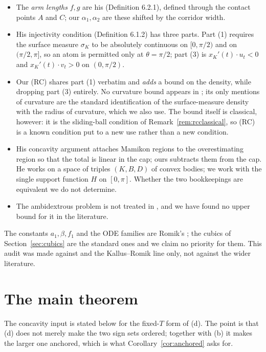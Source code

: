 \documentclass[11pt]{article}
\theoremstyle{definition}
\begin{document}
\begin{itemize}
\item The \emph{arm lengths} $f,g$ are his (Definition 6.2.1), defined through the contact
points $A$ and $C$; our $\alpha_1,\alpha_2$ are these shifted by the corridor width.
\item His injectivity condition (Definition 6.1.2) has three parts. Part (1) requires the
surface measure $\sigma_K$ to be absolutely continuous on $[0,\pi/2)$ and on $(\pi/2,\pi]$,
so an atom is permitted only at $\theta=\pi/2$; part (3) is
$x_K'(t)\cdot u_t<0$ and $x_K'(t)\cdot v_t>0$ on $(0,\pi/2)$.
\item Our (RC) shares part (1) verbatim and \emph{adds} a bound on the density, while
dropping part (3) entirely. No curvature bound appears in \cite{Bae24}; its only mentions
of curvature are the standard identification of the surface-measure density with the
radius of curvature, which we also use. The bound itself is classical, however: it is the
sliding-ball condition of Remark~\ref{rem:rcclassical}, so (RC) is a known condition put to
a new use rather than a new condition.
\item His concavity argument attaches Mamikon regions to the overestimating region so that
the total is linear in the cap; ours subtracts them from the cap. He works on a space of
triples $(K,B,D)$ of convex bodies; we work with the single support function $H$ on
$[0,\pi]$. Whether the two bookkeepings are equivalent we do not determine.
\item The ambidextrous problem is not treated in \cite{Bae24}, and we have found no upper
bound for it in the literature.
\end{itemize}

The constants $a_1,\beta,f_1$ and the ODE families are Romik's \cite{Rom18}; the cubics of
Section~\ref{sec:cubics} are the standard ones and we claim no priority for them. This
audit was made against \cite{Bae24} and the Kallus--Romik line \cite{KR18} only, not
against the wider literature.

\section{The main theorem}\label{sec:main}

The concavity input is stated below for the fixed-$T$ form of (d). The point is that (d)
does not merely make the two sign sets ordered; together with (b) it makes the larger one
anchored, which is what Corollary~\ref{cor:anchored} asks for.
\end{document}
